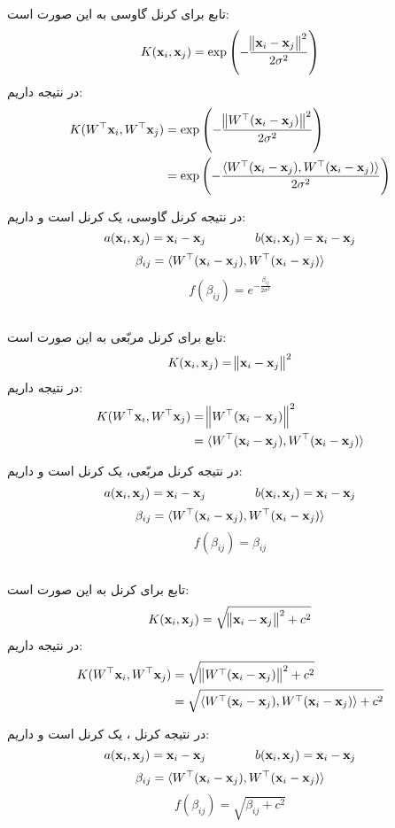 \subsection{}
تابع
برای کرنل گاوسی به این صورت است:
\[K(\mathbf{x}_i,\mathbf{x}_j) =\exp\left(-\frac{\norm{\mathbf{x}_i-\mathbf{x}_j}^2}{2\sigma^2}\right)\]
در نتیجه داریم:
\begin{align*}
K(W^\top\mathbf{x}_i,W^\top\mathbf{x}_j) &= \exp\left(-\frac{\norm{W^\top(\mathbf{x}_i-\mathbf{x}_j)}^2}{2\sigma^2}\right) \\&= 
\exp\left(-\frac{\langle W^\top(\mathbf{x}_i-\mathbf{x}_j),W^\top(\mathbf{x}_i-\mathbf{x}_j)\rangle}{2\sigma^2}\right)
\end{align*}

در نتیجه کرنل گاوسی، یک کرنل
است و داریم:
\[a(\mathbf{x}_i,\mathbf{x}_j) = \mathbf{x}_i-\mathbf{x}_j\qquad\qquad b(\mathbf{x}_i,\mathbf{x}_j) = \mathbf{x}_i-\mathbf{x}_j\]
\[\beta_{ij} = \langle W^\top(\mathbf{x}_i-\mathbf{x}_j),W^\top(\mathbf{x}_i-\mathbf{x}_j)\rangle \]
\[f(\beta_{ij}) = e^{-\frac{\beta_{ij}}{2\sigma^2}}\]
\subsection{}
تابع
برای کرنل مربّعی به این صورت است:
\[K(\mathbf{x}_i,\mathbf{x}_j) = \norm{\mathbf{x}_i - \mathbf{x}_j}^2\]
در نتیجه داریم:
\begin{align*}
K(W^\top\mathbf{x}_i,W^\top\mathbf{x}_j) &= \norm{W^\top(\mathbf{x}_i - \mathbf{x}_j)}^2\\
&= \langle W^\top(\mathbf{x}_i-\mathbf{x}_j),W^\top(\mathbf{x}_i-\mathbf{x}_j)\rangle
\end{align*}

در نتیجه کرنل مربّعی، یک کرنل
است و داریم:
\[a(\mathbf{x}_i,\mathbf{x}_j) = \mathbf{x}_i - \mathbf{x}_j\qquad\qquad b(\mathbf{x}_i,\mathbf{x}_j) = \mathbf{x}_i - \mathbf{x}_j\]
\[\beta_{ij} = \langle W^\top(\mathbf{x}_i-\mathbf{x}_j),W^\top(\mathbf{x}_i-\mathbf{x}_j)\rangle\]
\[f(\beta_{ij}) = \beta_{ij}\]

\subsection{}

تابع
برای کرنل 
 به این صورت است:
\[K(\mathbf{x}_i,\mathbf{x}_j) = \sqrt{\norm{\mathbf{x}_i - \mathbf{x}_j}^2 + c^2}\]
در نتیجه داریم:
\begin{align*}
K(W^\top\mathbf{x}_i,W^\top\mathbf{x}_j) &= \sqrt{\norm{W^\top(\mathbf{x}_i - \mathbf{x}_j)}^2+c^2}\\
&= \sqrt{\langle W^\top(\mathbf{x}_i-\mathbf{x}_j),W^\top(\mathbf{x}_i-\mathbf{x}_j)\rangle+c^2}
\end{align*}

در نتیجه کرنل 
،
یک کرنل
است و داریم:
\[a(\mathbf{x}_i,\mathbf{x}_j) = \mathbf{x}_i - \mathbf{x}_j\qquad\qquad b(\mathbf{x}_i,\mathbf{x}_j) = \mathbf{x}_i - \mathbf{x}_j\]
\[\beta_{ij} = \langle W^\top(\mathbf{x}_i-\mathbf{x}_j),W^\top(\mathbf{x}_i-\mathbf{x}_j)\rangle\]
\[f(\beta_{ij}) = \sqrt{\beta_{ij}+c^2}\]



